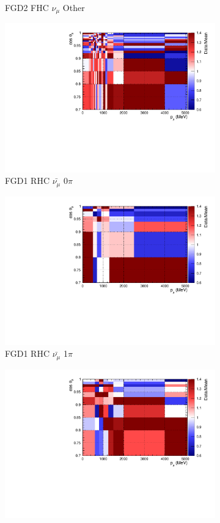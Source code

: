 \begin{figure}
\begin{subfigure}{.32\textwidth}
  \caption{FGD2 FHC $\nu_{\mu}$ Other}
  \label{fig:priorpred_FGD2_numuCC_other}
\end{subfigure}
\centering
\begin{subfigure}{.32\textwidth}
  \centering
  \includegraphics[width=0.85\linewidth]{figs/priorpred_FGD1_anti-numuCC_0pi.pdf}
  \caption{FGD1 RHC $\bar{\nu_{\mu}}$ 0$\pi$}
  \label{fig:priorpred_FGD1_anti-numuCC_0pi}
\end{subfigure}
\begin{subfigure}{.32\textwidth}
  \centering
  \includegraphics[width=0.85\linewidth]{figs/priorpred_FGD1_anti-numuCC_1pi.pdf}
  \caption{FGD1 RHC $\bar{\nu_{\mu}}$ 1$\pi$}
  \label{fig:priorpred_FGD1_anti-numuCC_1pi}
\end{subfigure}
\begin{subfigure}{.32\textwidth}
  \centering
  \includegraphics[width=0.85\linewidth]{figs/priorpred_FGD1_anti-numuCC_other.pdf}

\end{subfigure}
\end{figure}
